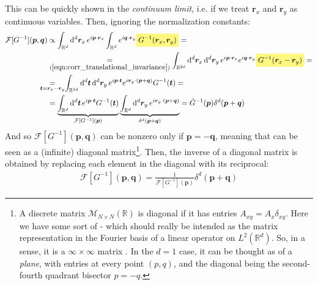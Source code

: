 \documentclass[../../main.tex]{subfiles}
\begin{document}
\medskip

This can be quickly shown in the \textit{continuum limit}, i.e. if we treat $\bm{r}_{x}$ and $\bm{r}_y$ as continuous variables. Then, ignoring the normalization constants: 
\begin{align} \label{eqn:fourier-basis1}
    \mathcal{F}[G^{-1}](\bm{p}, \bm{q}) 
    &\propto
    \int_{\mathbb{R}^d} \dd[d]{\bm{r}_x} e^{i \bm{p} \cdot \bm{r}_x} \int_{\mathbb{R}^d} e^{i \bm{q} \cdot \bm{r}_y}\hlc{Yellow}{G^{-1}(\bm{r}_x, \bm{r}_y)} = \\ \nonumber
    &\underset{(\ref{eqn:corr_translational_invariance})}{=}  \int_{\mathbb{R}^{2d}} \dd[d]{\bm{r}_x} \dd[d]{\bm{r}_y} e^{i \bm{p}\cdot \bm{r}_x} e^{i \bm{q}\cdot \bm{r}_y} \hlc{Yellow}{G^{-1}(\bm{r}_x - \bm{r}_y)} =\\ \nonumber
    &\underset{\mathclap{\bm{t} = \bm{r}_x - \bm{r}_y}}{=} \quad \int_{\mathbb{R}^{2d}} \dd[d]{\bm{t}} \dd[d]{\bm{r}_y} e^{i \bm{p} \cdot \bm{t}} e^{i \bm{r}_y \cdot (\bm{p} + \bm{q})} G^{-1}(\bm{t}) =\\ \nonumber
    &= \underbrace{\int_{\mathbb{R}^d} \dd[d]{\bm{t}} e^{i \bm{p} \cdot \bm{t}} G^{-1}(\bm{t})}_{\mathcal{F}[G^{-1}](\bm{p})} \underbrace{\int_{\mathbb{R}^d} \dd[d]{\bm{r}_y} e^{i \bm{r}_y \cdot (\bm{p} + \bm{q})}}_{\delta^d(\bm{p} + \bm{q})} = \tilde{G}^{-1}(\bm{p}) \delta^d(\bm{p} + \bm{q})
\end{align} 
And so $\mathcal{F}[G^{-1}](\bm{p}, \bm{q})$ can be nonzero only if $\bm{p} = -\bm{q}$, meaning that can be seen as a (infinite) diagonal matrix\footnote{A discrete matrix $\mathcal{M}_{N \times N}(\mathbb{R})$ is diagonal if it has entries $A_{xy} = A_{x} \delta_{xy}$. Here we have some sort of  - which should really be intended as the matrix representation in the Fourier basis of a linear operator on $L^2(\mathbb{R}^d)$. So, in a sense, it is a $\infty \times \infty$ matrix . In the $d=1$ case, it can be thought as of a \textit{plane}, with entries at every point $(p,q)$, and the diagonal being the second-fourth quadrant bisector $p=-q$.}. Then, the inverse of a diagonal matrix is obtained by replacing each element in the diagonal with its reciprocal:
\begin{align*}
    \mathcal{F}[G^{-1}](\bm{p}, \bm{q}) = \frac{1}{\mathcal{F}[G^{-1}](\bm{p})} \delta^{d}(\bm{p} + \bm{q}) 
\end{align*} 
\end{document}
